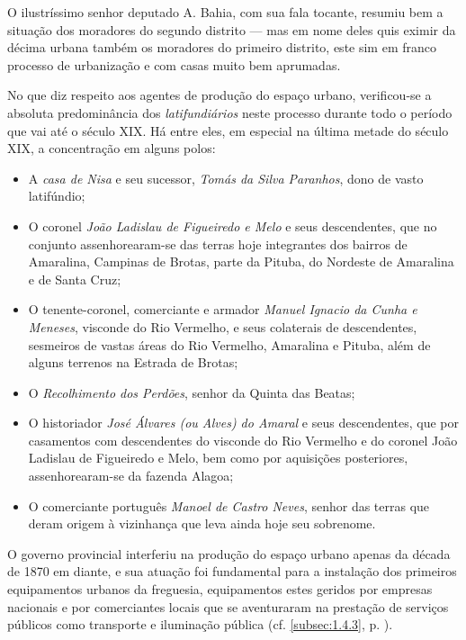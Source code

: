 O ilustríssimo senhor deputado A. Bahia, com sua fala tocante, resumiu bem a situação dos moradores do segundo distrito --- mas em nome deles quis eximir da décima urbana também os moradores do primeiro distrito, este sim em franco processo de urbanização e com casas muito bem aprumadas.

No que diz respeito aos agentes de produção do espaço urbano, verificou-se a absoluta predominância dos \textit{latifundiários} neste processo durante todo o período que vai até o século XIX. Há entre eles, em especial na última metade do século XIX, a concentração em alguns polos: 

\begin{itemize}
\item A \textit{casa de Nisa} e seu sucessor, \textit{Tomás da Silva Paranhos}, dono de vasto latifúndio;
\item O coronel \textit{João Ladislau de Figueiredo e Melo} e seus descendentes, que no conjunto assenhorearam-se das terras hoje integrantes dos bairros de Amaralina, Campinas de Brotas, parte da Pituba, do Nordeste de Amaralina e de Santa Cruz; 
\item O tenente-coronel, comerciante e armador \textit{Manuel Ignacio da Cunha e Meneses}, visconde do Rio Vermelho, e seus colaterais de descendentes, sesmeiros de vastas áreas do Rio Vermelho, Amaralina e Pituba, além de alguns terrenos na Estrada de Brotas;
\item O \textit{Recolhimento dos Perdões}, senhor da Quinta das Beatas;
\item O historiador \textit{José Álvares (ou Alves) do Amaral} e seus descendentes, que por casamentos com descendentes do visconde do Rio Vermelho e do coronel João Ladislau de Figueiredo e Melo, bem como por aquisições posteriores, assenhorearam-se da fazenda Alagoa;
\item O comerciante português \textit{Manoel de Castro Neves}, senhor das terras que deram origem à vizinhança que leva ainda hoje seu sobrenome.
\end{itemize}

O governo provincial interferiu na produção do espaço urbano apenas da década de 1870 em diante, e sua atuação foi fundamental para a instalação dos primeiros equipamentos urbanos da freguesia, equipamentos estes geridos por empresas nacionais e por comerciantes locais que se aventuraram na prestação de serviços públicos como transporte e iluminação pública (cf. \autoref{subsec:1.4.3}, p. \pageref{subsec:1.4.3}).

